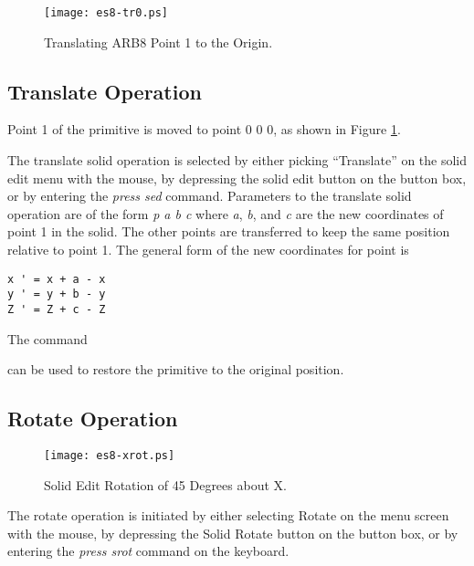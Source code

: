 \begin{figure}
\centering \texttt{[image: es8-tr0.ps]}
\caption{Translating ARB8 Point 1 to the Origin.}
\label{es8-tr0}
\end{figure}

\subsection{Translate Operation}


Point 1 of the primitive is moved to point 0 0 0,
as shown in Figure \ref{es8-tr0}.

The translate solid operation is selected
by either picking ``Translate'' on the solid edit menu
with the mouse, by depressing the solid edit button on the button box,
or by entering the {\em press sed} command.
Parameters to the translate solid operation
are of the form {\em p a b c}
where {\em a}, {\em b}, and {\em c} are the new coordinates
of point 1 in the solid.
The other points are transferred to keep the same position
relative to point 1.
The general form of the new coordinates for point is

\begin{center}
\begin{verbatim}
x ' = x + a - x
y ' = y + b - y
Z ' = Z + c - Z
\end{verbatim}
\end{center}

The command


can be used to restore the primitive to the original position.

\subsection{Rotate Operation}

\begin{figure}
\centering \texttt{[image: es8-xrot.ps]}
\caption{Solid Edit Rotation of 45 Degrees about X.}
\label{es8-xrot}
\end{figure}

The rotate operation is initiated by either selecting Rotate on the menu
screen with the mouse,
by depressing the Solid Rotate button on the button box,
or by entering the {\em press srot} command on the keyboard.

